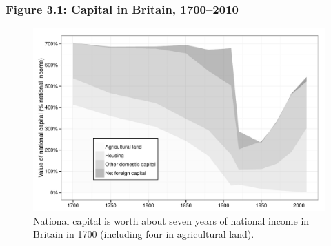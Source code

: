 \documentclass[t]{beamer}\usepackage[]{graphicx}\usepackage[]{color}
\newenvironment{knitrout}{}{} %
\begin{document}
\begin{frame}[label=Figure_3_1]
\frametitle{Figure 3.1: Capital in Britain, 1700--2010}
\begin{figure}[t]
\begin{minipage}[b]{\textwidth}
\centering
\begin{knitrout}\footnotesize
{}\color{fgcolor}

{\centering \includegraphics[width=1\linewidth]{figures/bw/Figure_3_1} 

}



\end{knitrout}
\caption{National capital is worth about seven years of national income in Britain in 1700 (including four in agricultural land).}
\end{minipage}
\end{figure}
\end{frame}
\end{document}
